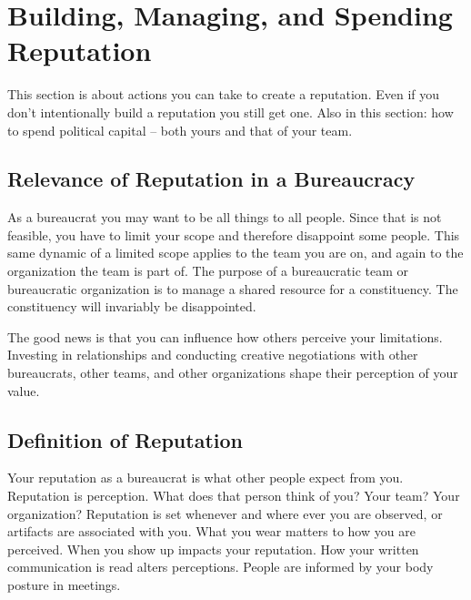 \section{Building, Managing, and Spending Reputation\label{sec:reputation}}




This section is about actions you can take to create a reputation. Even if you don't intentionally build a reputation you still get one. Also in this section: how to spend political capital -- both yours and that of your team. 

\subsection*{Relevance of Reputation in a Bureaucracy}

As a bureaucrat you may want to be all things to all people. Since that is not feasible, you have to limit your scope and therefore disappoint some people. This same dynamic of a limited scope applies to the team you are on, and again to the organization the team is part of. The purpose of a bureaucratic team or bureaucratic organization is to manage a shared resource for a constituency. The constituency will invariably be disappointed. 

The good news is that you can influence how others perceive your limitations. Investing in relationships and conducting creative negotiations with other bureaucrats, other teams, and other organizations shape their perception of your value. 

\subsection*{Definition of Reputation}

Your \gls{reputation} as a bureaucrat is what other people expect from you. \iftoggle{glossaryinmargin}{\marginpar{[Glossary]}}{}
Reputation is perception. What does that person think of you? Your team? Your organization? 
Reputation is set whenever and where ever you are observed, or artifacts are associated with you. 
What you wear matters to how you are perceived. When you show up impacts your reputation. How your written communication is read alters perceptions. People are informed by your body posture in meetings. 

